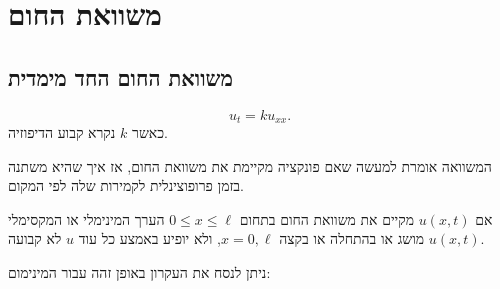 \documentclass{tstextbook}
\begin{document}
\chapter{משוואת החום}

\section{משוואת החום החד מימדית}

\begin{definition}
$$u_{t}=k u_{x x}.$$
כאשר \(k\) נקרא קבוע הדיפוזיה. 

\end{definition}
\begin{remark}
המשוואה אומרת למעשה שאם פונקציה מקיימת את משוואת החום, אז איך שהיא משתנה בזמן פרופוצינלית לקמירות שלה לפי המקום. 

\end{remark}
\begin{proposition}
אם \(u(x,t)\) מקיים את משוואת החום בתחום \(0\leq x\leq \ell\) הערך המינימלי או המקסימלי \(u(x,t)\) מושג או בהתחלה או בקצה \(x=0,\ell\), ולא יופיע באמצע כל עוד \(u\) לא קבועה.

\end{proposition}
ניתן לנסח את העקרון באופן זהה עבור המינימום:
\end{document}
